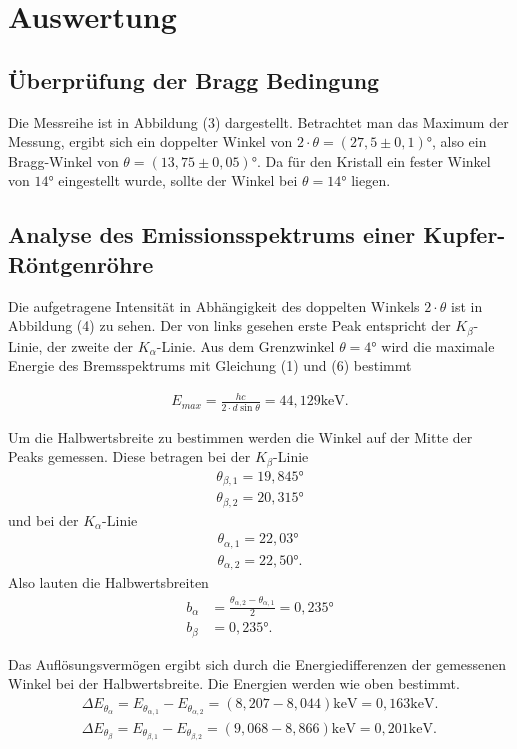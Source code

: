 \section{Auswertung}
\label{sec:Auswertung}

\subsection{Überprüfung der Bragg Bedingung}
Die Messreihe ist in Abbildung (3) dargestellt.
Betrachtet man das Maximum der Messung, ergibt sich ein doppelter Winkel von $2 \cdot \theta = (27,5 \pm 0,1)$°, also ein Bragg-Winkel von $\theta = (13,75 \pm 0,05)$°. Da für den Kristall ein fester Winkel von $14$° eingestellt wurde, sollte der Winkel bei $\theta = 14$° liegen.


\subsection{Analyse des Emissionsspektrums einer Kupfer-Röntgenröhre}
Die aufgetragene Intensität in Abhängigkeit des doppelten Winkels $2 \cdot \theta$ ist in Abbildung (4) zu sehen.
Der von links gesehen erste Peak entspricht der $K_{\beta}$-Linie, der zweite der $K_{\alpha}$-Linie.
Aus dem Grenzwinkel $\theta = 4$° wird die maximale Energie des Bremsspektrums mit Gleichung (1) und (6) bestimmt

\begin{align*}
E_{max} = \frac{hc}{2\cdot d \sin{\theta}} = 44,129 \si{\keV} .
\end{align*}

\noindent Um die Halbwertsbreite zu bestimmen werden die Winkel auf der Mitte der Peaks gemessen. 
Diese betragen bei der $K_{\beta}$-Linie
\begin{align*}
\theta_{\beta,1} = 19,845° \\
\theta_{\beta,2} = 20,315°
\end{align*}
und bei der $K_{\alpha}$-Linie
\begin{align*}
\theta_{\alpha,1} = 22,03° \\
\theta_{\alpha,2} = 22,50° .
\end{align*}
Also lauten die Halbwertsbreiten
\begin{align*}
b_{\alpha} &= \frac{\theta_{\alpha,2} - \theta_{\alpha,1}}{2} = 0,235° \\
b_{\beta} &= 0,235° .
\end{align*}

\noindent Das Auflösungsvermögen ergibt sich durch die Energiedifferenzen der gemessenen Winkel bei der Halbwertsbreite. Die Energien werden wie oben bestimmt.
\begin{align*}
\Delta E_{\theta_{\alpha}} = E_{\theta_{\alpha,1}} - E_{\theta_{\alpha,2}} = (8,207 - 8,044) \si{\keV} = 0,163 \si{\keV}. \\
\Delta E_{\theta_{\beta}} = E_{\theta_{\beta,1}} - E_{\theta_{\beta,2}} = (9,068 - 8,866) \si{\keV} = 0,201 \si{\keV}. 
\end{align*}


